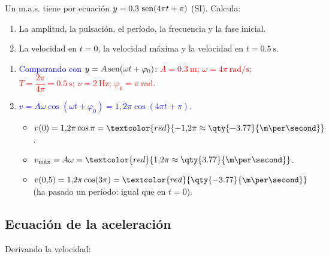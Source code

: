 \begin{exercise}
    Un m.a.s. tiene por ecuación \(y = 0{,}3\,\operatorname{sen}(4\pi t + \pi)\) (SI). Calcula:
    \begin{enumerate}[label=\letraminuscula]
        \item La amplitud, la pulsación, el período, la frecuencia y la fase inicial.
        \item La velocidad en \(t = 0\), la velocidad máxima y la velocidad en \(t = \qty{0.5}{\second}\).
    \end{enumerate}
    \begin{solu}
        \begin{enumerate}[label=\letraminuscula]
            \item \textcolor{blue}{Comparando con \(y = A\operatorname{sen}(\omega t + \varphi_0)\):}
            \textcolor{red}{\(A = \qty{0.3}{\m}\); \(\omega = 4\pi\ \unit{\radian\per\second}\); \(T = \dfrac{2\pi}{4\pi} = \qty{0.5}{\second}\);
            \(\nu = \qty{2}{\hertz}\); \(\varphi_0 = \pi\ \unit{\radian}\).}
            \item \textcolor{blue}{\(v = A\omega\cos(\omega t + \varphi_0) = 1{,}2\pi\cos(4\pi t + \pi)\).}
            \begin{itemize}
                \item \(v(0) = 1{,}2\pi\cos\pi = \textcolor{red}{-1{,}2\pi \approx \qty{-3.77}{\m\per\second}}\).
                \item \(v_{\text{máx}} = A\omega = \textcolor{red}{1{,}2\pi \approx \qty{3.77}{\m\per\second}}\).
                \item \(v(0{,}5) = 1{,}2\pi\cos(3\pi) = \textcolor{red}{\qty{-3.77}{\m\per\second}}\) (ha pasado un período: igual que en \(t = 0\)).
            \end{itemize}
        \end{enumerate}
    \end{solu}
\end{exercise}

\subsection{Ecuación de la aceleración}\label{subsec:mas-aceleracion}

Derivando la velocidad:
\begin{centeredequation}
     \label{eq:mas-aceleracion}
\end{centeredequation}

